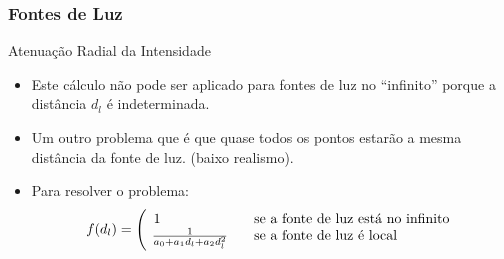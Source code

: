 \documentclass{beamer}
\begin{document}
\begin{frame}
\frametitle{Fontes de Luz}

	\begin{block}{Atenuação Radial da Intensidade}
		\begin{itemize}
			\item Este cálculo não pode ser aplicado para fontes de luz no ``infinito'' porque a distância $d_l$ é indeterminada.
			\item Um outro problema que é que quase todos os pontos estarão a mesma distância da fonte de luz. (baixo realismo).
			\item Para resolver o problema:
			\begin{equation*}
				f(d_l) = \Big{(
  \begin{array}{l l}
    1 & \quad \text{se a fonte de luz está no infinito}\\
    \frac{1}{a_0 + a_1d_l + a_2d^{2}_{l}} & \quad \text{se a fonte de luz é local}
  \end{array} }
			\end{equation*}			 
		\end{itemize}
	\end{block}
\end{frame}


\end{document}
